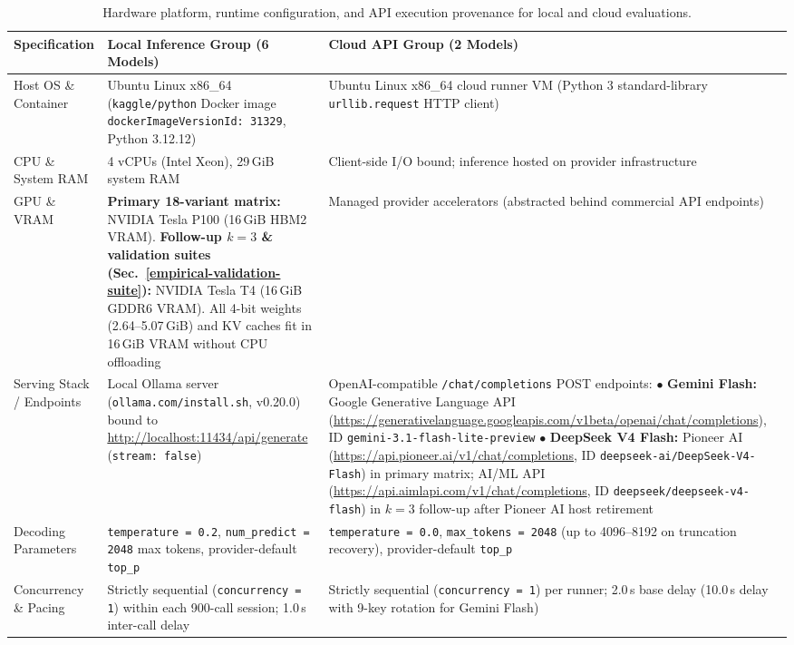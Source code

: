 \documentclass[a4paper,fleqn]{cas-sc}
\begin{document}
\begin{table}[!htbp]
\centering
\caption{Hardware platform, runtime configuration, and API execution provenance for local and cloud evaluations.}\label{tab:execution-provenance}
\scriptsize
\setlength{\tabcolsep}{4pt}
\begin{tabular}{@{}p{}p{}p{}@{}}
\toprule
\textbf{Specification} & \textbf{Local Inference Group (6 Models)} & \textbf{Cloud API Group (2 Models)} \\
\midrule
Host OS \& Container & Ubuntu Linux x86\_64 (\texttt{kaggle/python} Docker image \texttt{dockerImageVersionId: 31329}, Python 3.12.12) & Ubuntu Linux x86\_64 cloud runner VM (Python 3 standard-library \texttt{urllib.request} HTTP client) \\
CPU \& System RAM & 4 vCPUs (Intel Xeon), 29\,GiB system RAM & Client-side I/O bound; inference hosted on provider infrastructure \\
GPU \& VRAM & \textbf{Primary 18-variant matrix:} NVIDIA Tesla P100 (16\,GiB HBM2 VRAM). \textbf{Follow-up $k=3$ \& validation suites (Sec.~\ref{empirical-validation-suite}):} NVIDIA Tesla T4 (16\,GiB GDDR6 VRAM). All 4-bit weights (2.64--5.07\,GiB) and KV caches fit in 16\,GiB VRAM without CPU offloading & Managed provider accelerators (abstracted behind commercial API endpoints) \\
Serving Stack / Endpoints & Local Ollama server (\texttt{ollama.com/install.sh}, v0.20.0) bound to \url{http://localhost:11434/api/generate} (\texttt{stream:\ false}) & OpenAI-compatible \texttt{/chat/completions} POST endpoints:\newline
$\bullet$ \textbf{Gemini Flash:} Google Generative Language API (\url{https://generativelanguage.googleapis.com/v1beta/openai/chat/completions}), ID \texttt{gemini-3.1-flash-lite-preview}\newline
$\bullet$ \textbf{DeepSeek V4 Flash:} Pioneer AI (\url{https://api.pioneer.ai/v1/chat/completions}, ID \texttt{deepseek-ai/DeepSeek-V4-Flash}) in primary matrix; AI/ML API (\url{https://api.aimlapi.com/v1/chat/completions}, ID \texttt{deepseek/deepseek-v4-flash}) in $k=3$ follow-up after Pioneer AI host retirement \\
Decoding Parameters & \texttt{temperature = 0.2}, \texttt{num\_predict = 2048} max tokens, provider-default \texttt{top\_p} & \texttt{temperature = 0.0}, \texttt{max\_tokens = 2048} (up to 4096--8192 on truncation recovery), provider-default \texttt{top\_p} \\
Concurrency \& Pacing & Strictly sequential (\texttt{concurrency = 1}) within each 900-call session; 1.0\,s inter-call delay & Strictly sequential (\texttt{concurrency = 1}) per runner; 2.0\,s base delay (10.0\,s delay with 9-key rotation for Gemini Flash) \\

\end{tabular}
\end{table}
\end{document}
